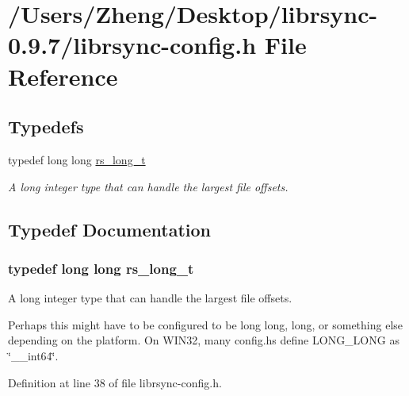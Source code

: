 \hypertarget{librsync-config_8h}{}\section{/\+Users/\+Zheng/\+Desktop/librsync-\/0.9.7/librsync-\/config.h File Reference}
\label{librsync-config_8h}
\subsection*{Typedefs}
\begin{DoxyCompactItemize}
\item 
typedef long long \hyperlink{librsync-config_8h_a6edddd44ca74c10ea65ef82d116e0ffa}{rs\+\_\+long\+\_\+t}
\begin{DoxyCompactList}\small\item\em A long integer type that can handle the largest file offsets. \end{DoxyCompactList}\end{DoxyCompactItemize}


\subsection{Typedef Documentation}
\hypertarget{librsync-config_8h_a6edddd44ca74c10ea65ef82d116e0ffa}{}
\subsubsection[{rs\+\_\+long\+\_\+t}]{\setlength{\rightskip}{0pt plus 5cm}typedef long long {\bf rs\+\_\+long\+\_\+t}}\label{librsync-config_8h_a6edddd44ca74c10ea65ef82d116e0ffa}


A long integer type that can handle the largest file offsets. 

Perhaps this might have to be configured to be \textquotesingle{}long long\textquotesingle{}, \textquotesingle{}long\textquotesingle{}, or something else depending on the platform. On W\+I\+N32, many config.\+h\textquotesingle{}s define L\+O\+N\+G\+\_\+\+L\+O\+N\+G as \char`\"{}\+\_\+\+\_\+int64\char`\"{}. 

Definition at line 38 of file librsync-\/config.\+h.

